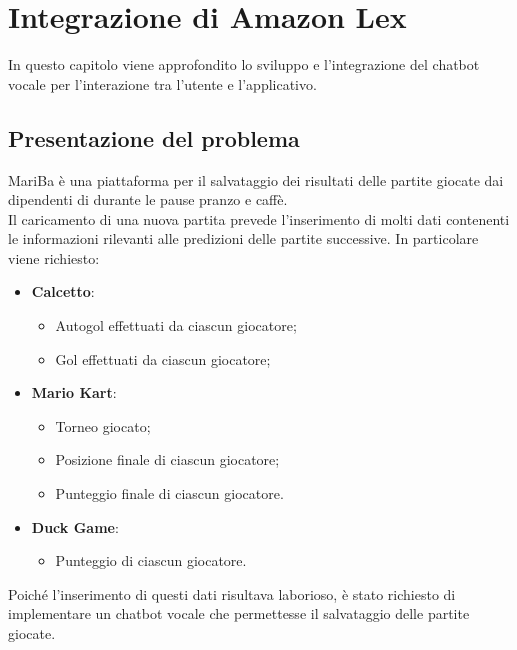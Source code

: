 
\chapter{Integrazione di Amazon Lex}
\label{cap:lex}

In questo capitolo viene approfondito lo sviluppo e l'integrazione del \gls{chatbot} vocale per l'interazione tra l'utente e l'applicativo. \\


\section{Presentazione del problema}
MariBa è una piattaforma per il salvataggio dei risultati delle partite giocate dai dipendenti di \azienda durante le 
pause pranzo e caffè. \\
Il caricamento di una nuova partita prevede l'inserimento di molti dati contenenti le informazioni rilevanti alle predizioni delle partite successive. 
In particolare viene richiesto: 
\begin{itemize}
	\item \textbf{Calcetto}:
	\begin{itemize}
		\item Autogol effettuati da ciascun giocatore;
		\item Gol effettuati da ciascun giocatore;
	\end{itemize}
	\item \textbf{Mario Kart}:
	\begin{itemize}
		\item Torneo giocato;
		\item Posizione finale di ciascun giocatore;
		\item Punteggio finale di ciascun giocatore.
	\end{itemize}
	\item \textbf{Duck Game}:
	\begin{itemize}
		\item Punteggio di ciascun giocatore.
	\end{itemize}
\end{itemize}
Poiché l'inserimento di questi dati risultava laborioso, è stato richiesto di implementare un \gls{chatbot} vocale 
che permettesse il salvataggio delle partite giocate.

